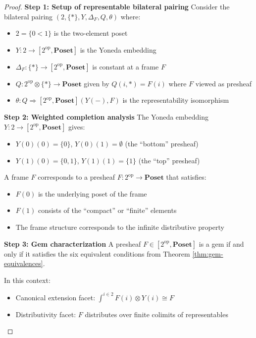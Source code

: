\documentclass[11pt]{article}
\theoremstyle{plain}
\theoremstyle{definition}
\theoremstyle{remark}
\newcommand{\op}{\mathrm{op}}
\begin{document}
\begin{proof}
\textbf{Step 1: Setup of representable bilateral pairing}
Consider the bilateral pairing $(2, \{\ast\}, Y, \Delta_F, Q, \theta)$ where:
\begin{itemize}
\item $2 = \{0 < 1\}$ is the two-element poset
\item $Y : 2 \to [2^{\op}, \mathbf{Poset}]$ is the Yoneda embedding
\item $\Delta_F : \{\ast\} \to [2^{\op}, \mathbf{Poset}]$ is constant at a frame $F$
\item $Q : 2^{\op} \otimes \{\ast\} \to \mathbf{Poset}$ given by $Q(i, \ast) = F(i)$ where $F$ viewed as presheaf
\item $\theta : Q \Rightarrow [2^{\op}, \mathbf{Poset}](Y(-), F)$ is the representability isomorphism
\end{itemize}

\textbf{Step 2: Weighted completion analysis}
The Yoneda embedding $Y : 2 \to [2^{\op}, \mathbf{Poset}]$ gives:
\begin{itemize}
\item $Y(0)(0) = \{0\}$, $Y(0)(1) = \emptyset$ (the ``bottom'' presheaf)
\item $Y(1)(0) = \{0, 1\}$, $Y(1)(1) = \{1\}$ (the ``top'' presheaf)
\end{itemize}

A frame $F$ corresponds to a presheaf $F : 2^{\op} \to \mathbf{Poset}$ that satisfies:
\begin{itemize}
\item $F(0)$ is the underlying poset of the frame
\item $F(1)$ consists of the ``compact'' or ``finite'' elements
\item The frame structure corresponds to the infinite distributive property
\end{itemize}

\textbf{Step 3: Gem characterization}
A presheaf $F \in [2^{\op}, \mathbf{Poset}]$ is a gem if and only if it satisfies the six equivalent conditions from Theorem \ref{thm:gem-equivalences}.

In this context:
\begin{itemize}
\item Canonical extension facet: $\int^{i \in 2} F(i) \otimes Y(i) \cong F$
\item Distributivity facet: $F$ distributes over finite colimits of representables
\end{itemize}


\end{proof}
\end{document}
